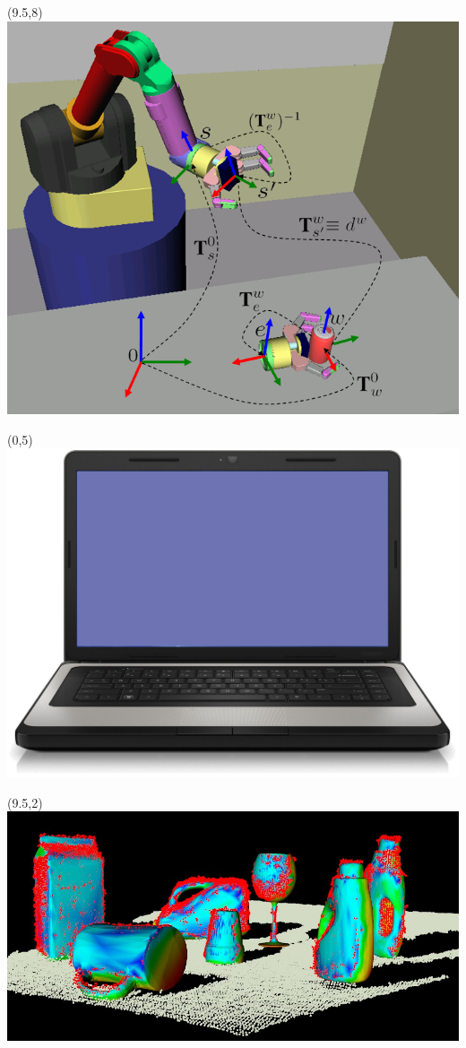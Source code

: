 \documentclass{beamer}
\begin{document}
\begin{frame}[plain]{}
\begin{textblock}{5}
         \end{textblock} 
         \begin{textblock}{5}(9.5,8)
             \includegraphics[width=1.2\linewidth]{figures/pick_and_place.png}
         \end{textblock}           
         \begin{textblock}{5}(0,5)
             \includegraphics[width=0.6\linewidth]{figures/laptop.png}
         \end{textblock}                      
         \begin{textblock}{5}(9.5,2)
             \includegraphics[width=1.0\linewidth]{figures/object_recognition.jpg}
         \end{textblock} 
         

\end{frame}
\end{document}

